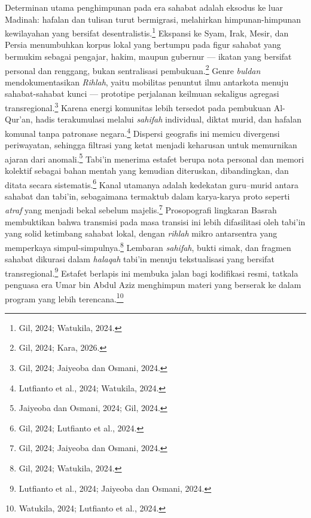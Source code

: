 Determinan utama penghimpunan pada era sahabat adalah eksodus ke luar Madinah: hafalan dan tulisan turut bermigrasi, melahirkan himpunan-himpunan kewilayahan yang bersifat desentralistis.\footnote{Gil, 2024; Watukila, 2024.} Ekspansi ke Syam, Irak, Mesir, dan Persia menumbuhkan korpus lokal yang bertumpu pada figur sahabat yang bermukim sebagai pengajar, hakim, maupun gubernur --- ikatan yang bersifat personal dan renggang, bukan sentralisasi pembukuan.\footnote{Gil, 2024; Kara, 2026.} Genre \textit{buldan} mendokumentasikan \textit{Rihlah}, yaitu mobilitas penuntut ilmu antarkota menuju sahabat-sahabat kunci --- prototipe perjalanan keilmuan sekaligus agregasi transregional.\footnote{Gil, 2024; Jaiyeoba dan Osmani, 2024.} Karena energi komunitas lebih tersedot pada pembukuan Al-Qur'an, hadis terakumulasi melalui \textit{sahifah} individual, diktat murid, dan hafalan komunal tanpa patronase negara.\footnote{Lutfianto et al., 2024; Watukila, 2024.} Dispersi geografis ini memicu divergensi periwayatan, sehingga filtrasi yang ketat menjadi keharusan untuk memurnikan ajaran dari anomali.\footnote{Jaiyeoba dan Osmani, 2024; Gil, 2024.} Tabi'in menerima estafet berupa nota personal dan memori kolektif sebagai bahan mentah yang kemudian diteruskan, dibandingkan, dan ditata secara sistematis.\footnote{Gil, 2024; Lutfianto et al., 2024.} Kanal utamanya adalah kedekatan guru--murid antara sahabat dan tabi'in, sebagaimana termaktub dalam karya-karya proto seperti \textit{atraf} yang menjadi bekal sebelum majelis.\footnote{Gil, 2024; Jaiyeoba dan Osmani, 2024.} Prosopografi lingkaran Basrah membuktikan bahwa transmisi pada masa transisi ini lebih difasilitasi oleh tabi'in yang solid ketimbang sahabat lokal, dengan \textit{rihlah} mikro antarsentra yang memperkaya simpul-simpulnya.\footnote{Gil, 2024; Watukila, 2024.} Lembaran \textit{sahifah}, bukti simak, dan fragmen sahabat dikurasi dalam \textit{halaqah} tabi'in menuju tekstualisasi yang bersifat transregional.\footnote{Lutfianto et al., 2024; Jaiyeoba dan Osmani, 2024.} Estafet berlapis ini membuka jalan bagi kodifikasi resmi, tatkala penguasa era Umar bin Abdul Aziz menghimpun materi yang berserak ke dalam program yang lebih terencana.\footnote{Watukila, 2024; Lutfianto et al., 2024.}

